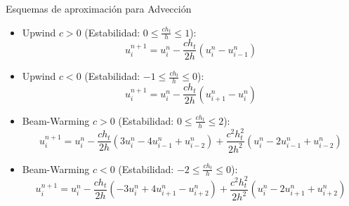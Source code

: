 \documentclass{beamer}
\begin{document}
\begin{frame}{Esquemas de aproximaci\'on para Advecci\'on }

\begin{itemize}
\item Upwind $c > 0$ (Estabilidad: $0 \leq \frac{c h_t}{h} \leq 1$): 
\begin{displaymath}
u_{i}^{n+1} = u_{i}^{n} - \dfrac{c h_t}{2 h}\left(u_{i}^{n} - u_{i-1}^{n} \right)
\end{displaymath}	
\item Upwind $c < 0$ (Estabilidad: $-1 \leq \frac{c h_t}{h} \leq 0$): 
\begin{displaymath}
u_{i}^{n+1} = u_{i}^{n} - \dfrac{c h_t}{2 h}\left(u_{i+1}^{n} - u_{i}^{n} \right)
\end{displaymath}
\item Beam-Warming $c > 0$ (Estabilidad: $0 \leq \frac{c h_t}{h} \leq 2$): 
\begin{displaymath}
u_{i}^{n+1} = u_{i}^{n} - \dfrac{c h_t}{2 h}\left(3u_{i}^{n} -4 u_{i-1}^{n} + u_{i-2}^n\right) + \dfrac{c^2 h_t^2}{2 h^2}\left(u_{i}^{n} - 2u_{i-1}^{n} + u_{i-2}^{n} \right)
\end{displaymath}	
\item Beam-Warming $c < 0$ (Estabilidad: $-2 \leq \frac{c h_t}{h} \leq 0$): 
\begin{displaymath}
u_{i}^{n+1} = u_{i}^{n} - \dfrac{c h_t}{2 h}\left(-3u_{i}^{n} +4 u_{i+1}^{n} - u_{i+2}^n\right) + \dfrac{c^2 h_t^2}{2 h^2}\left(u_{i}^{n} - 2u_{i+1}^{n} + u_{i+2}^{n} \right)
\end{displaymath}	

\end{itemize}

\end{frame}
\end{document}
